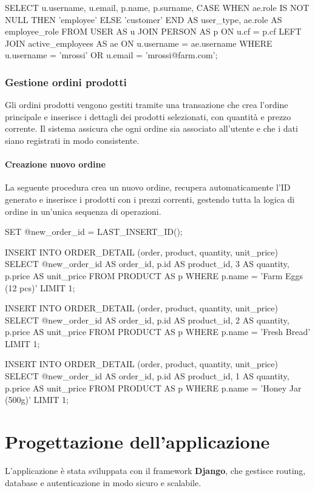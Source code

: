 \documentclass[a4paper,12pt]{report}
\begin{document}
\begin{sqlcode}[caption={}]
SELECT
  u.username,
  u.email,
  p.name,
  p.surname,
  CASE WHEN ae.role IS NOT NULL THEN 'employee' ELSE 'customer' END AS user_type,
  ae.role AS employee_role
FROM USER AS u
JOIN PERSON AS p ON u.cf = p.cf
LEFT JOIN active_employees AS ae ON u.username = ae.username
WHERE u.username = 'mrossi' OR u.email = 'mrossi@farm.com';
\end{sqlcode}

\newpage
\subsection{Gestione ordini prodotti}
Gli ordini prodotti vengono gestiti tramite una transazione che crea
l'ordine principale e inserisce i dettagli dei prodotti selezionati,
con quantità e prezzo corrente. Il sistema assicura che ogni ordine
sia associato all'utente e che i dati siano registrati in modo consistente.

\subsubsection{Creazione nuovo ordine}
La seguente procedura crea un nuovo ordine, recupera automaticamente
l'ID generato e inserisce i prodotti con i prezzi correnti, gestendo
tutta la logica di ordine in un'unica sequenza di operazioni.

\begin{sqlcode}[caption={}]
SET @new_order_id = LAST_INSERT_ID();

INSERT INTO ORDER_DETAIL (order, product, quantity, unit_price)
SELECT
  @new_order_id AS order_id,
  p.id AS product_id,
  3 AS quantity,
  p.price AS unit_price
FROM PRODUCT AS p
WHERE p.name = 'Farm Eggs (12 pcs)'
LIMIT 1;

INSERT INTO ORDER_DETAIL (order, product, quantity, unit_price)
SELECT
  @new_order_id AS order_id,
  p.id AS product_id,
  2 AS quantity,
  p.price AS unit_price
FROM PRODUCT AS p
WHERE p.name = 'Fresh Bread'
LIMIT 1;

INSERT INTO ORDER_DETAIL (order, product, quantity, unit_price)
SELECT
  @new_order_id AS order_id,
  p.id AS product_id,
  1 AS quantity,
  p.price AS unit_price
FROM PRODUCT AS p
WHERE p.name = 'Honey Jar (500g)'
LIMIT 1;
\end{sqlcode}

\chapter{Progettazione dell'applicazione}
L'applicazione è stata sviluppata con il framework \textbf{Django},
che gestisce routing,
database e autenticazione in modo sicuro e scalabile.
\end{document}
